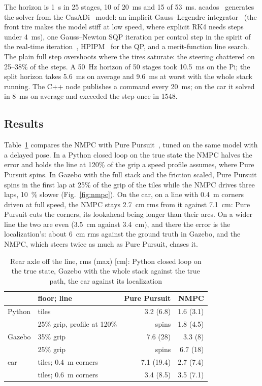 \documentclass[conference]{IEEEtran}
\begin{document}
The horizon is \SI{1}{s} in 25 stages, 10 of \SI{20}{ms} and 15 of \SI{53}{ms}. acados~\cite{acados2022} generates
the solver from the CasADi~\cite{casadi2019} model: an implicit Gauss--Legendre integrator~\cite{hairer1996} (the
front tire makes the model stiff at low speed, where explicit RK4 needs steps under \SI{4}{ms}), one Gauss--Newton SQP
iteration per control step in the spirit of the real-time iteration~\cite{diehl2005}, HPIPM~\cite{hpipm2020} for
the QP, and a merit-function line search. The plain full step overshoots where the tires saturate: the steering
chattered on 25--38\% of the steps. A \SI{50}{Hz} horizon of 50 stages took \SI{10.5}{ms} on the Pi;
the split horizon takes \SI{5.6}{ms} on average and \SI{9.6}{ms} at worst with the whole stack running. The C++
node publishes a command every \SI{20}{ms}; on the car it solved in \SI{8}{ms} on average and exceeded the step once
in 1548.

\subsection{Results}

Table~\ref{tab:nmpc} compares the NMPC with Pure Pursuit~\cite{coulter1992}, tuned on the same model with a
delayed pose. In a Python closed loop on the true state the NMPC halves the error and holds the line at 120\% of
the grip a speed profile assumes, where Pure Pursuit spins. In Gazebo with the full stack and the friction scaled,
Pure Pursuit spins in the first lap at 25\% of the grip of the tiles while the NMPC drives three laps,
\SI{10}{\percent} slower (Fig.~\ref{fig:nmpc}). On the car, on a line with \SI{0.4}{m} corners driven at full speed,
the NMPC stays \SI{2.7}{cm} rms from it against \SI{7.1}{cm}: Pure Pursuit cuts the corners, its lookahead being
longer than their arcs. On a wider line the two are even (\SI{3.5}{cm} against \SI{3.4}{cm}), and there the error
is the localization's: about \SI{6}{cm} rms against the ground truth in Gazebo, and the NMPC, which steers twice as
much as Pure Pursuit, chases it.

\begin{table}[t]
\caption{Rear axle off the line, rms (max) [cm]: Python closed loop on the true state, Gazebo with the whole stack
against the true path, the car against its localization}
\label{tab:nmpc}
\centering
\footnotesize
\begin{tabular}{@{}llrr@{}}
\toprule
& floor; line & Pure Pursuit & NMPC \\
\midrule
Python & tiles & 3.2 (6.8) & 1.6 (3.1) \\
& 25\% grip, profile at 120\% & spins & 1.8 (4.5) \\
Gazebo & 35\% grip & 7.6 (28) & 3.3 (8) \\
& 25\% grip & spins & 6.7 (18) \\
car & tiles; \SI{0.4}{m} corners & 7.1 (19.4) & 2.7 (7.4) \\
& tiles; \SI{0.6}{m} corners & 3.4 (8.5) & 3.5 (7.1) \\
\bottomrule
\end{tabular}
\end{table}
\end{document}
